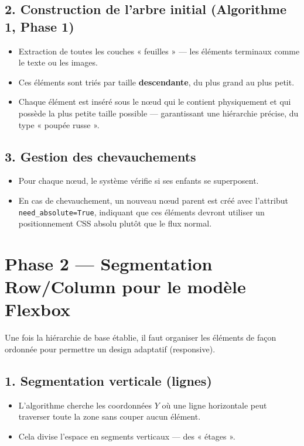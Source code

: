 \documentclass[11pt,a4paper]{article}
\newcommand{\code}[1]{\texttt{#1}}
\begin{document}
\subsection*{2. Construction de l'arbre initial (Algorithme 1, Phase 1)}
\begin{itemize}[leftmargin=1.2em, itemsep=4pt]
  \item Extraction de toutes les couches « feuilles » --- les éléments terminaux comme le texte ou les images.
  \item Ces éléments sont triés par taille \textbf{descendante}, du plus grand au plus petit.
  \item Chaque élément est inséré sous le nœud qui le contient physiquement et qui possède la plus petite taille possible --- garantissant une hiérarchie précise, du type « poupée russe ».
\end{itemize}

\subsection*{3. Gestion des chevauchements}
\begin{itemize}[leftmargin=1.2em, itemsep=4pt]
  \item Pour chaque nœud, le système vérifie si ses enfants se superposent.
  \item En cas de chevauchement, un nouveau nœud parent est créé avec l'attribut \code{need\_absolute=True}, indiquant que ces éléments devront utiliser un positionnement CSS absolu plutôt que le flux normal.
\end{itemize}



\section*{Phase 2 --- Segmentation Row/Column pour le modèle Flexbox}

Une fois la hiérarchie de base établie, il faut organiser les éléments de façon ordonnée pour permettre un design adaptatif (responsive).

\subsection*{1. Segmentation verticale (lignes)}
\begin{itemize}[leftmargin=1.2em, itemsep=4pt]
  \item L'algorithme cherche les coordonnées $Y$ où une ligne horizontale peut traverser toute la zone sans couper aucun élément.
  \item Cela divise l'espace en segments verticaux --- des « étages ».
\end{itemize}
\end{document}
